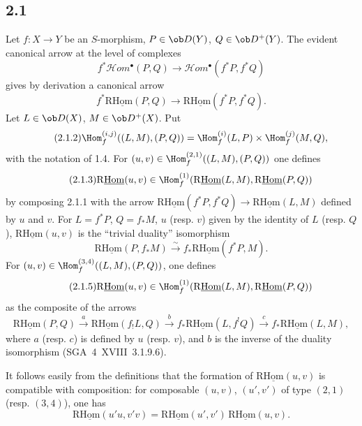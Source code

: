 \subsection*{2.1}
Let $f:X\to Y$ be an $S$-morphism, $P\in\ob D(Y)$, $Q\in\ob D^{+}(Y)$. The evident canonical arrow at the level of complexes
\[
f^{*}\mathcal Hom^{\bullet}(P,Q)\longrightarrow\mathcal Hom^{\bullet}(f^{*}P,f^{*}Q)
\]
gives by derivation a canonical arrow
\begin{equation}\tag{2.1.1}
f^{*}\mathrm{R}\underline{\mathrm{Hom}}(P,Q)\longrightarrow\mathrm{R}\underline{\mathrm{Hom}}(f^{*}P,f^{*}Q).
\end{equation}
Let $L\in\ob D(X)$, $M\in\ob D^{+}(X)$. Put
\begin{equation}\tag{2.1.2}
\Hom_f^{(i,j)}((L,M),(P,Q))=\Hom_f^{(i)}(L,P)\times\Hom_f^{(j)}(M,Q),
\end{equation}
with the notation of 1.4. For $(u,v)\in\Hom_f^{(2,1)}((L,M),(P,Q))$ one defines
\begin{equation}\tag{2.1.3}
\mathrm{R}\underline{\mathrm{Hom}}(u,v)\in\Hom_f^{(1)}(\mathrm{R}\underline{\mathrm{Hom}}(L,M),\mathrm{R}\underline{\mathrm{Hom}}(P,Q))
\end{equation}
by composing 2.1.1 with the arrow $\mathrm{R}\underline{\mathrm{Hom}}(f^{*}P,f^{*}Q)\to\mathrm{R}\underline{\mathrm{Hom}}(L,M)$ defined by $u$ and $v$. For $L=f^{*}P$, $Q=f_{*}M$, $u$ (resp. $v$) given by the identity of $L$ (resp. $Q$), $\mathrm{R}\underline{\mathrm{Hom}}(u,v)$ is the ``trivial duality'' isomorphism
\begin{equation}\tag{2.1.4}
\mathrm{R}\underline{\mathrm{Hom}}(P,f_{*}M)\xrightarrow{\sim}f_{*}\mathrm{R}\underline{\mathrm{Hom}}(f^{*}P,M).
\end{equation}
For $(u,v)\in\Hom_f^{(3,4)}((L,M),(P,Q))$, one defines
\begin{equation}\tag{2.1.5}
\mathrm{R}\underline{\mathrm{Hom}}(u,v)\in\Hom_f^{(1)}(\mathrm{R}\underline{\mathrm{Hom}}(L,M),\mathrm{R}\underline{\mathrm{Hom}}(P,Q))
\end{equation}
as the composite of the arrows
\[
\mathrm{R}\underline{\mathrm{Hom}}(P,Q)\xrightarrow{a}\mathrm{R}\underline{\mathrm{Hom}}(f_{!}L,Q)\xrightarrow{b}f_{*}\mathrm{R}\underline{\mathrm{Hom}}(L,f^{!}Q)\xrightarrow{c}f_{*}\mathrm{R}\underline{\mathrm{Hom}}(L,M),
\]
where $a$ (resp. $c$) is defined by $u$ (resp. $v$), and $b$ is the inverse of the duality isomorphism (SGA~4~XVIII~3.1.9.6).

It follows easily from the definitions that the formation of $\mathrm{R}\underline{\mathrm{Hom}}(u,v)$ is compatible with composition: for composable $(u,v)$, $(u',v')$ of type $(2,1)$ (resp. $(3,4)$), one has
\begin{equation}\tag{2.1.6}
\mathrm{R}\underline{\mathrm{Hom}}(u'u,v'v)=\mathrm{R}\underline{\mathrm{Hom}}(u',v')\,\mathrm{R}\underline{\mathrm{Hom}}(u,v).
\end{equation}

